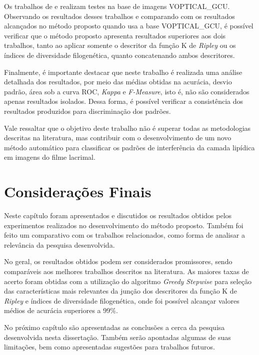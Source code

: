 Os trabalhos de  e  realizam testes na base de imagens VOPTICAL\_GCU. Observando os resultados desses trabalhos e comparando com os resultados alcançados no método proposto quando usa a base VOPTICAL\_GCU, é possível verificar que o método proposto apresenta resultados superiores aos dois trabalhos, tanto ao aplicar somente o descritor da função K de \textit{Ripley} ou os índices de diversidade filogenética, quanto concatenando ambos descritores. 

Finalmente, é importante destacar que neste trabalho é realizada uma análise detalhada dos resultados, por meio das médias obtidas na acurácia, desvio padrão, área sob a curva ROC, \textit{Kappa} e \textit{F-Measure}, isto é, não são considerados apenas resultados isolados. Dessa forma, é possível verificar a consistência dos resultados produzidos para discriminação dos padrões.

Vale ressaltar que o objetivo deste trabalho não é superar todas as metodologias descritas na literatura, mas contribuir com o desenvolvimento de um novo método automático para classificar os padrões de interferência da camada lipídica em imagens do filme lacrimal.

\section{Considerações Finais}

Neste capítulo foram apresentados e discutidos os resultados obtidos pelos experimentos realizados no desenvolvimento do método proposto. Também foi feito um comparativo com os trabalhos relacionados, como forma de analisar a relevância da pesquisa desenvolvida.

No geral, os resultados obtidos podem ser considerados promissores, sendo
comparáveis aos melhores trabalhos descritos na literatura. As maiores taxas de acerto
foram obtidas com a utilização do algoritmo \textit{Greedy Stepwise} para seleção das características mais relevantes da junção dos descritores da função K de \textit{Ripley} e índices de diversidade filogenética, onde foi possível alcançar valores médios de acurácia superiores a 99\%.

No próximo capítulo são apresentadas as conclusões a cerca da pesquisa desenvolvida nesta dissertação. Também serão apontadas algumas de suas limitações, bem como apresentadas sugestões para trabalhos futuros.